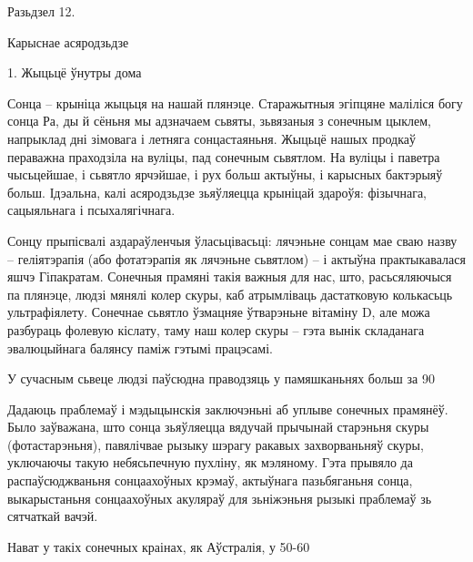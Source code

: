Разьдзел 12. 

Карыснае асяродзьдзе

1. Жыцьцё ўнутры дома

Сонца – крыніца жыцьця на нашай плянэце. Старажытныя эгіпцяне маліліся богу сонца Ра, ды й сёньня мы адзначаем сьвяты, зьвязаныя з сонечным цыклем, напрыклад дні зімовага і летняга сонцастаяньня. Жыцьцё нашых продкаў пераважна праходзіла на вуліцы, пад сонечным сьвятлом. На вуліцы і паветра чысьцейшае, і сьвятло ярчэйшае, і рух больш актыўны, і карысных бактэрыяў больш. Ідэальна, калі асяродзьдзе зьяўляецца крыніцай здароўя: фізычнага, сацыяльнага і псыхалягічнага.

Сонцу прыпісвалі аздараўленчыя ўласьцівасьці: лячэньне сонцам мае сваю назву – геліятэрапія (або фотатэрапія як лячэньне сьвятлом) -- і актыўна практыкавалася яшчэ Гіпакратам. Сонечныя прамяні такія важныя для нас, што, расьсяляючыся па плянэце, людзі мянялі колер скуры, каб атрымліваць дастатковую колькасьць ультрафіялету. Сонечнае сьвятло ўзмацняе ўтварэньне вітаміну D, але можа разбураць фолевую кіслату, таму наш колер скуры – гэта вынік складанага эвалюцыйнага балянсу паміж гэтымі працэсамі.

У сучасным сьвеце людзі паўсюдна праводзяць у памяшканьнях больш за 90%

Дадаюць праблемаў і мэдыцынскія заключэньні аб уплыве сонечных прамянёў. Было заўважана, што сонца зьяўляецца вядучай прычынай старэньня скуры (фотастарэньня), павялічвае рызыку шэрагу ракавых захворваньняў скуры, уключаючы такую небясьпечную пухліну, як мэляному. Гэта прывяло да распаўсюджваньня сонцаахоўных крэмаў, актыўнага пазьбяганьня сонца, выкарыстаньня сонцаахоўных акуляраў для зьніжэньня рызыкі праблемаў зь сятчаткай вачэй.

Нават у такіх сонечных краінах, як Аўстралія, у 50-60%

